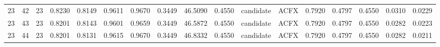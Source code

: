 \begin{tabular}{rrrrrrrrrrllrrrrr}
 23 &    42 &           23 &  0.8230 &   0.8149 &     0.9611 &      0.9670 &           0.3449 &      46.5090 &  0.4550 & candidate &   ACFX &          0.7920 &               0.4797 &                     0.4550 &   0.0310 &    0.0229 \\
 23 &    43 &           23 &  0.8201 &   0.8143 &     0.9601 &      0.9659 &           0.3449 &      46.5872 &  0.4550 & candidate &   ACFX &          0.7920 &               0.4797 &                     0.4550 &   0.0282 &    0.0223 \\
 23 &    44 &           23 &  0.8201 &   0.8131 &     0.9615 &      0.9670 &           0.3449 &      46.8332 &  0.4550 & candidate &   ACFX &          0.7920 &               0.4797 &                     0.4550 &   0.0282 &    0.0211 \\
\bottomrule
\end{tabular}
